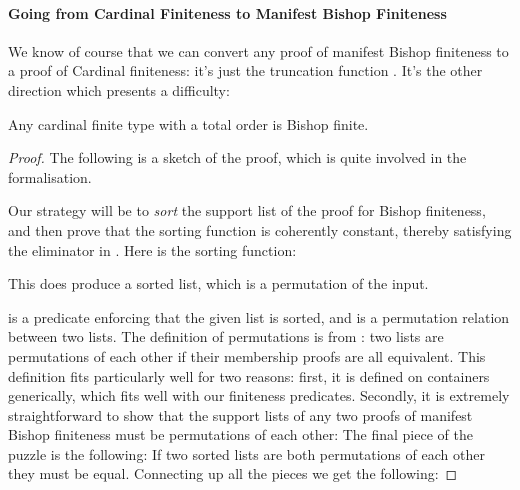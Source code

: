 \paragraph{Going from Cardinal Finiteness to Manifest Bishop Finiteness}
We know of course that we can convert any proof of manifest Bishop finiteness to
a proof of Cardinal finiteness: it's just the truncation function
\AgdaInductiveConstructor{\(\lvert \_ \rvert\)}.
It's the other direction which presents a difficulty:
\begin{theorem}\label{cardinal-to-manifest-bishop}
  Any cardinal finite type with a total order is Bishop finite.
\end{theorem}
\begin{proof}
  The following is a sketch of the proof, which is quite involved in the
  formalisation.

Our strategy will be to \emph{sort} the support list of the proof for Bishop
finiteness, and then prove that the sorting function is coherently constant,
thereby satisfying the eliminator in .
Here is the sorting function:

\begin{minipage}{\linewidth}
\begin{multicols}{2}
  
   \columnbreak \vfill \null \vfill
  
   \vfill \null
\end{multicols}
\end{minipage} \noindent%
This does produce a sorted list, which is a permutation of the input.
\begin{multicols}{2}
  
   \columnbreak
  
  
\end{multicols} \vspace{-\baselineskip}
 is a predicate
enforcing that the given list is sorted, and
\AgdaFunction{\(\leftrightsquigarrow\)} is a permutation relation between two
lists.
The definition of permutations is from
\citep{danielssonBagEquivalenceProofRelevant2012}: two lists are permutations of
each other if their membership proofs are all equivalent.
This definition fits particularly well for two reasons: first, it is defined on
containers generically, which fits well with our finiteness predicates.
Secondly, it is extremely straightforward to show that the support lists of any
two proofs of manifest Bishop finiteness must be permutations of each other:
The final piece of the puzzle is the following:
If two sorted lists are both permutations of each other they must be equal.
Connecting up all the pieces we get the following:


\end{proof}
